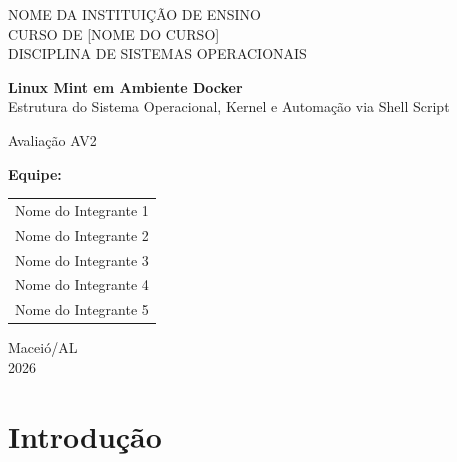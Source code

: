 \documentclass[a4paper,12pt]{article}
\begin{document}
\begin{titlepage}
    \centering
    \vspace*{1cm}

    {\large NOME DA INSTITUIÇÃO DE ENSINO}\\[0.3cm]
    {\large CURSO DE [NOME DO CURSO]}\\[0.3cm]
    {\large DISCIPLINA DE SISTEMAS OPERACIONAIS}

    \vspace{3cm}

    {\Huge \bfseries Linux Mint em Ambiente Docker}\\[0.5cm]
    {\Large Estrutura do Sistema Operacional, Kernel e Automação via Shell Script}

    \vspace{3cm}

    {\large Avaliação AV2}

    \vspace{2cm}

    {\large \textbf{Equipe:}}\\[0.3cm]
    \begin{tabular}{c}
        Nome do Integrante 1 \\
        Nome do Integrante 2 \\
        Nome do Integrante 3 \\
        Nome do Integrante 4 \\
        Nome do Integrante 5 \\
    \end{tabular}

    \vfill

    {\large Maceió/AL}\\
    {\large 2026}

\end{titlepage}

\tableofcontents
\newpage

\section{Introdução}
\end{document}
